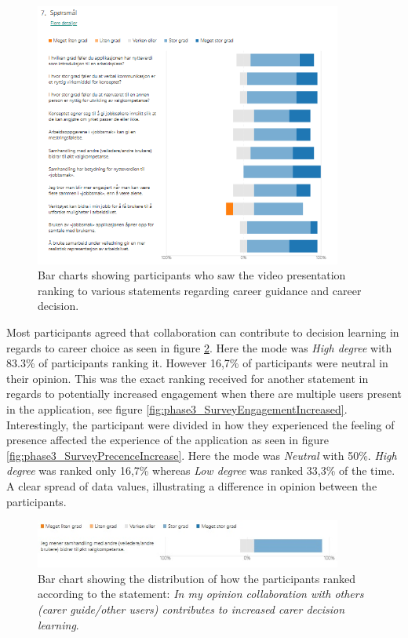 \begin{figure}[H]
  \centering
   \captionsetup{width=.8\linewidth}
    \includegraphics[width=0.9\textwidth]{fig/phase_3/survey/valgKompentanseVideoPNG.PNG}
 \caption{Bar charts showing participants who saw the video presentation ranking to various statements regarding career guidance and career decision.}
\label{fig:phase3_SurveyValgkompVideo}
\end{figure}






Most participants agreed that collaboration can contribute to decision learning in regards to career choice as seen in figure \ref{fig:phase3_SurveyCollaborationIncreased}. Here the mode was \textit{High degree} with 83.3\% of participants ranking it. However 16,7\% of participants were neutral in their opinion. This was the exact ranking received for another statement in regards to potentially increased engagement when there are multiple users present in the application, see figure \ref{fig:phase3_SurveyEngagementIncreased}. Interestingly, the participant were divided in how they experienced the feeling of presence affected the experience of the application as seen in figure \ref{fig:phase3_SurveyPrecenceIncrease}. Here the mode was \textit{Neutral} with 50\%. \textit{High degree} was ranked only 16,7\% whereas \textit{Low degree} was ranked 33,3\% of the time. A clear spread of data values, illustrating a difference in opinion between the participants.


\begin{figure}[H]
  \centering
   \captionsetup{width=.8\linewidth}
    \includegraphics[width=0.9\textwidth]{fig/phase_3/survey/ValgKompAppSamhandlingOkt.jpg}
 \caption{Bar chart showing the distribution of how the participants ranked according to the statement: \textit{In my opinion collaboration with others (carer guide/other users) contributes to increased carer decision learning}.}
\label{fig:phase3_SurveyCollaborationIncreased}
\end{figure}

